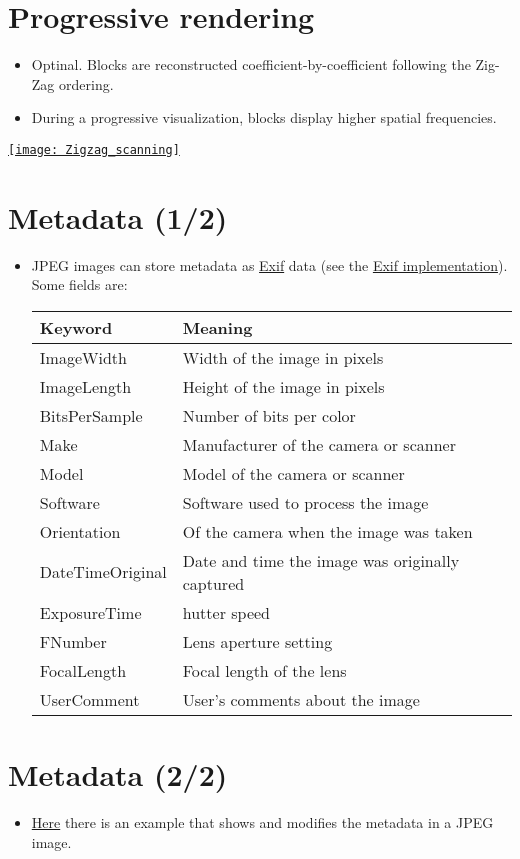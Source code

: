 \section{Progressive rendering}
\begin{itemize}
\item Optinal. Blocks are reconstructed coefficient-by-coefficient following the Zig-Zag ordering.
\item During a progressive visualization, blocks display higher
  spatial frequencies.
\end{itemize}
\begin{center}
  \href{https://es.m.wikipedia.org/wiki/Archivo:Zigzag_scanning.jpg}{\texttt{[image: Zigzag\_scanning]}}
\end{center}

\section{Metadata (1/2)}
\begin{itemize}
\item \gls{JPEG} images can store metadata as
  \href{https://en.wikipedia.org/wiki/Exif}{Exif} data (see the \href{https://gitlab.com/TNThieding/exif/-/blob/master/docs/api_reference.rst?ref_type=heads}{Exif implementation}). Some fields are:
  \vspace{-2ex}
  \begin{center}
    \begin{tabular}{l|l}
      Keyword & Meaning\\
      \hline
      ImageWidth & Width of the image in pixels \\
      ImageLength & Height of the image in pixels \\
      BitsPerSample&  Number of bits per color \\
      Make & Manufacturer of the camera or scanner \\
      Model & Model of the camera or scanner \\
      Software & Software used to process the image \\
      Orientation & Of the camera when the image was taken \\
      DateTimeOriginal & Date and time the image was originally captured \\
      ExposureTime & hutter speed \\
      FNumber & Lens aperture setting \\
      FocalLength & Focal length of the lens \\
      UserComment & User's comments about the image
    \end{tabular}
  \end{center}
\end{itemize}

\section*{Metadata (2/2)}
\begin{itemize}
\item
  \href{https://github.com/vicente-gonzalez-ruiz/medical_imaging/blob/main/notebooks/JPEG_add_metadata.ipynb}{Here}
  there is an example that shows and modifies the metadata in a JPEG
  image.
\end{itemize}
